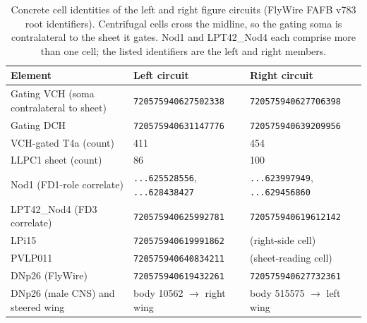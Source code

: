 \documentclass[11pt]{article}
\newcommand{\rid}[1]{\texttt{\small #1}}
\begin{document}
\begin{table}[t]
\centering
\caption{Concrete cell identities of the left and right figure circuits (FlyWire FAFB v783 root
identifiers). Centrifugal cells cross the midline, so the gating soma is contralateral to the
sheet it gates. Nod1 and LPT42\_Nod4 each comprise more than one cell; the listed identifiers are
the left and right members.}
\label{tab:identities}
\small
\begin{tabular}{@{}l l l@{}}
\toprule
Element & Left circuit & Right circuit \\
\midrule
Gating VCH (soma contralateral to sheet) & \rid{720575940627502338} & \rid{720575940627706398} \\
Gating DCH & \rid{720575940631147776} & \rid{720575940639209956} \\
VCH-gated T4a (count) & 411 & 454 \\
LLPC1 sheet (count) & 86 & 100 \\
Nod1 (FD1-role correlate) & \rid{...625528556}, \rid{...628438427} & \rid{...623997949}, \rid{...629456860} \\
LPT42\_Nod4 (FD3 correlate) & \rid{720575940625992781} & \rid{720575940619612142} \\
LPi15 & \rid{720575940619991862} & (right-side cell) \\
PVLP011 & \rid{720575940640834211} & (sheet-reading cell) \\
DNp26 (FlyWire) & \rid{720575940619432261} & \rid{720575940627732361} \\
DNp26 (male CNS) and steered wing & body 10562 $\to$ right wing & body 515575 $\to$ left wing \\
\bottomrule
\end{tabular}
\end{table}
\end{document}
